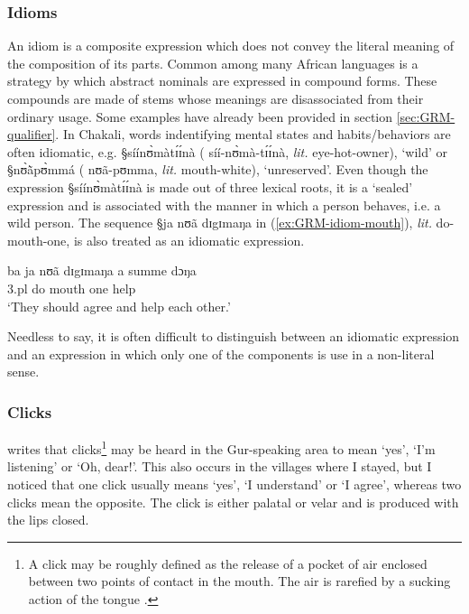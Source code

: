 \subsubsection{Idioms}
\label{sec:GRM-idiom}

An idiom is a  composite expression which does not convey the literal  meaning
 of the composition  of its parts. Common among many African languages is a
strategy by which  abstract nominals are expressed in compound forms. These
compounds are made of stems whose meanings are disassociated from their ordinary
usage. Some examples have already been provided in section
\ref{sec:GRM-qualifier}. 
In Chakali, words indentifying mental states and habits/behaviors are
often idiomatic, e.g. {\S síínʊ̀màtɪ́ɪ́nà} ({ síí-nʊ̀mà-tɪ́ɪ́nà}, {\it
lit.} eye-hot-owner), `wild' or {\S nʊ̀ã̀pʊ̀mmá} ({ nʊã-pʊmma}, {\it lit.} 
mouth-white), `unreserved'. Even though the expression {\S síínʊ̀màtɪ́ɪ́nà}
is made out of three lexical
roots, it is a `sealed' expression and is associated with the manner in which a
person behaves, i.e. a wild person. The sequence {\S ja
nʊã dɪgɪmaŋa} in (\ref{ex:GRM-idiom-mouth}), {\it lit.} do-mouth-one,  is also
treated as an idiomatic expression.


\begin{exe}
 \ex\label{ex:GRM-idiom-mouth}
   \gll   ba ja nʊã dɪgɪmaŋa a summe dɔŋa\\
{\sc 3.pl} do mouth one {\art} help {\recp} \\
\glt `They should agree and help each other.'

\end{exe}

Needless to say, it is often difficult to  distinguish between an idiomatic
expression and  an expression in which only one of the  components is use in a
 non-literal sense.



\subsubsection{Clicks}
\label{sec:GRM-greet}

\citet[151]{Nade89} writes that clicks\footnote{A click may be roughly defined
as  the release of a pocket of air enclosed between two points of contact in
the mouth. The air is rarefied by a sucking action of the tongue
\cite[see][]{Lade93}.}  may be  heard in the Gur-speaking area to  mean `yes',
`I'm listening' or `Oh, dear!'.  This also occurs in the villages where I
stayed, but
I noticed that one click usually means `yes', `I understand' or `I agree',
whereas two clicks mean the opposite. The click is either palatal or velar and
is produced with the lips closed.

